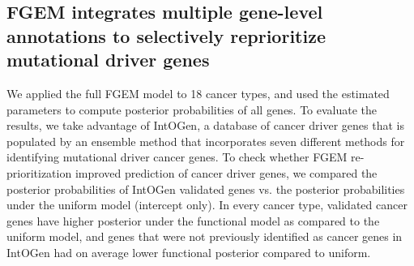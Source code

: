 \subsection{FGEM integrates multiple gene-level annotations to selectively reprioritize mutational driver genes}\label{sec:orgf0225be}

We applied the full FGEM model to 18 cancer types, and used the estimated parameters to compute posterior probabilities of all genes. To evaluate the results, we take advantage of IntOGen, a database of cancer driver genes that is populated by an ensemble method that incorporates seven different methods for identifying mutational driver cancer genes. To check whether FGEM re-prioritization improved prediction of cancer driver genes, we compared the posterior probabilities of IntOGen validated genes vs. the posterior probabilities under the uniform model (intercept only). In every cancer type, validated cancer genes have higher posterior under the functional model as compared to the uniform model, and genes that were not previously identified as cancer genes in IntOGen had on average lower functional posterior compared to uniform.

